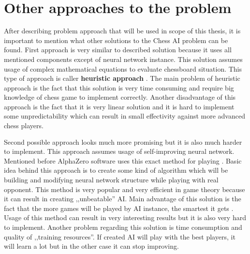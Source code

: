     \section{Other approaches to the problem}\label{sec:other-approaches-to-problem}
    After describing problem approach that will be used in scope of this thesis, it is important to mention what other solutions to the Chess AI problem can be found. First approach is very similar to described solution because it uses all mentioned components except of neural network instance. This solution assumes usage of complex mathematical equations to evaluate chessboard situation. This type of approach is caller \textbf{heuristic approach} \cite{bib:article-computer-chess-move-ordering,bib:internet-step-by-step-chess-ai}. The main problem of heuristic approach is the fact that this solution is very time consuming and require big knowledge of chess game to implement correctly. Another disadvantage of this approach is the fact that it is very linear solution and it is hard to implement some unpredictability which can result in small effectivity against more advanced chess players.

    Second possible approach looks much more promising but it is also much harder to implement. This approach assumes usage of self-improving neural network. Mentioned before AlphaZero software uses this exact method for playing \cite{bib:internet-alphazero}. Basic idea behind this approach is to create some kind of algorithm which will be building and modifying neural network structure while playing with real opponent. This method is very popular and very efficient in game theory because it can result in creating ,,unbeatable'' AI. Main advantage of this solution is the fact that the more games will be played by AI instance, the smartest it gets \cite{bib:article-self-improving-nn}. Usage of this method can result in very interesting results but it is also very hard to implement. Another problem regarding this solution is time consumption and quality of ,,training resources''. If created AI will play with the best players, it will learn a lot but in the other case it can stop improving.



